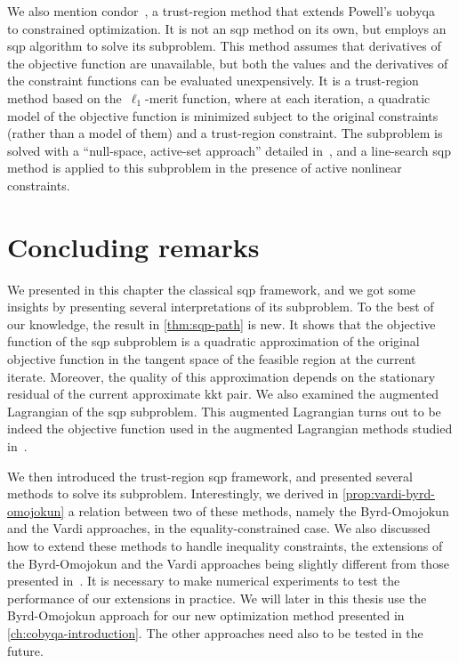 We also mention \gls{condor}~\cite{Berghen_2004,Berghen_Bersini_2004}, a trust-region method that extends Powell's \gls{uobyqa}~\cite{Powell_2002} to constrained optimization.
It is not an \gls{sqp} method on its own, but employs an \gls{sqp} algorithm to solve its subproblem.
This method assumes that derivatives of the objective function are unavailable, but both the values and the derivatives of the constraint functions can be evaluated unexpensively.
It is a trust-region method based on the~$\ell_1$-merit function, where at each iteration, a quadratic model of the objective function is minimized subject to the original constraints (rather than a model of them) and a trust-region constraint.
The subproblem is solved with a \enquote{null-space, active-set approach} detailed in~\cite[\S~9.3]{Berghen_2004}, and a line-search \gls{sqp} method is applied to this subproblem in the presence of active nonlinear constraints.

\section{Concluding remarks}

We presented in this chapter the classical \gls{sqp} framework, and we got some insights by presenting several interpretations of its subproblem.
To the best of our knowledge, the result in \cref{thm:sqp-path} is new.
It shows that the objective function of the \gls{sqp} subproblem is a quadratic approximation of the original objective function in the tangent space of the feasible region at the current iterate.
Moreover, the quality of this approximation depends on the stationary residual of the current approximate \gls{kkt} pair.
We also examined the augmented Lagrangian of the \gls{sqp} subproblem.
This augmented Lagrangian turns out to be indeed the objective function used in the augmented Lagrangian methods studied in~\cite{Niu_Yuan_2010,Wang_Yuan_2014}.

We then introduced the trust-region \gls{sqp} framework, and presented several methods to solve its subproblem.
Interestingly, we derived in \cref{prop:vardi-byrd-omojokun} a relation between two of  these methods, namely the Byrd-Omojokun and the Vardi approaches, in the equality-constrained case.
We also discussed how to extend these methods to handle inequality constraints, the extensions of the Byrd-Omojokun and the Vardi approaches being slightly different from those presented in~\cite[\S~15.4]{Conn_Gould_Toint_2000}.
It is necessary to make numerical experiments to test the performance of our extensions in practice.
We will later in this thesis use the Byrd-Omojokun approach for our new optimization method presented in \cref{ch:cobyqa-introduction}.
The other approaches need also to be tested in the future.
